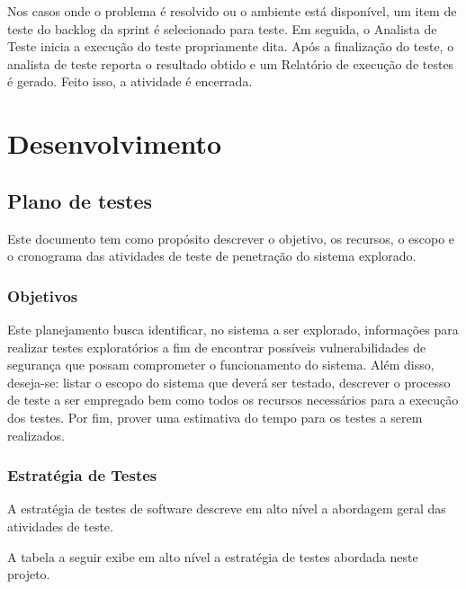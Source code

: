 \documentclass[
    12pt,               %
    openright,          %
    oneside,            %
    a4paper,            %
    section=TITLE,     %
    english,            %
    french,             %
    spanish,            %
    brazil              %
    ]{abntex2}
\begin{document}
Nos casos onde o problema é resolvido ou o ambiente está disponível, um item de teste do backlog da sprint é selecionado para teste. Em seguida, o Analista de Teste inicia a execução do teste propriamente dita. Após a finalização do teste, o analista de teste reporta o resultado obtido e um Relatório de execução de testes é gerado. Feito isso, a atividade é encerrada.



\chapter{Desenvolvimento}


\section{Plano de testes}

Este documento tem como propósito descrever o objetivo, os recursos, o escopo e o cronograma das atividades de teste de penetração do sistema explorado.



\subsection*{Objetivos}

Este planejamento busca identificar, no sistema a ser explorado, informações para realizar testes exploratórios a fim de encontrar possíveis vulnerabilidades de segurança que possam comprometer o funcionamento do sistema. Além disso, deseja-se: listar o escopo do sistema que deverá ser testado, descrever o processo de teste a ser empregado bem como todos os recursos necessários para a execução dos testes. Por fim, prover uma estimativa do tempo para os testes a serem realizados.



\subsection*{Estratégia de Testes}

A estratégia de testes de software descreve em alto nível a abordagem geral das atividades de teste.


A tabela a seguir exibe em alto nível a estratégia de testes abordada neste projeto.
\end{document}
